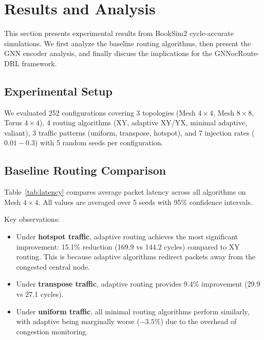 \section{Results and Analysis}
\label{sec:results}

This section presents experimental results from BookSim2 cycle-accurate simulations. We first analyze the baseline routing algorithms, then present the GNN encoder analysis, and finally discuss the implications for the GNNocRoute-DRL framework.

\subsection{Experimental Setup}

We evaluated 252 configurations covering 3 topologies (Mesh $4\times4$, Mesh $8\times8$, Torus $4\times4$), 4 routing algorithms (XY, adaptive XY/YX, minimal adaptive, valiant), 3 traffic patterns (uniform, transpose, hotspot), and 7 injection rates ($0.01-0.3$) with 5 random seeds per configuration.

\subsection{Baseline Routing Comparison}

Table~\ref{tab:latency} compares average packet latency across all algorithms on Mesh $4\times4$. All values are averaged over 5 seeds with 95\% confidence intervals.

\begin{table}[h]
\centering
\caption{Average packet latency (cycles) on Mesh $4\times4$}
\label{tab:latency}
\end{table}

Key observations:
\begin{itemize}
    \item Under \textbf{hotspot traffic}, adaptive routing achieves the most significant improvement: 15.1\% reduction (169.9 vs 144.2 cycles) compared to XY routing. This is because adaptive algorithms redirect packets away from the congested central node.
    \item Under \textbf{transpose traffic}, adaptive routing provides 9.4\% improvement (29.9 vs 27.1 cycles).
    \item Under \textbf{uniform traffic}, all minimal routing algorithms perform similarly, with adaptive being marginally worse ($-3.5\%$) due to the overhead of congestion monitoring.
\end{itemize}

